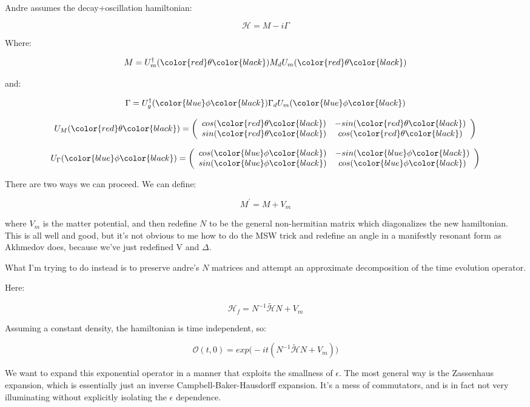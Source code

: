 \documentclass[10pt,letterpaper]{article}
\newcommand{\red}{\color{red}}
\newcommand{\blue}{\color{blue}}
\newcommand{\black}{\color{black}}
\begin{document}
Andre assumes the decay+oscillation hamiltonian:

$$\mathcal{H} = M -i\Gamma$$

Where: 



$$M = U_m^{\dagger}(\red\theta\black)M_d U_m(\red\theta\black)$$

and:

$$\Gamma = U_g^{\dagger}(\blue\phi\black)\Gamma_d U_m(\blue\phi\black)$$




\[U_{M}(\red\theta\black) = \left( \begin{array}{ccc}
cos(\red\theta\black) & -sin(\red\theta\black) \\
sin(\red\theta\black) & cos(\red\theta\black) \\
\end{array} \right)\] 

\[U_{\Gamma}(\blue\phi\black) = \left( \begin{array}{ccc}
cos(\blue\phi\black) & -sin(\blue\phi\black) \\
sin(\blue\phi\black) & cos(\blue\phi\black) \\
\end{array} \right)\]


There are two ways we can proceed. We can define:

$$M^{\prime} = M+V_m$$

where $V_m$ is the matter potential, and then redefine $N$ to be the general non-hermitian matrix which diagonalizes the new hamiltonian. This is all well and good, but it's not obvious to me how to do the MSW trick and redefine an angle in a manifestly resonant form as Akhmedov does, because we've just redefined V and $\Delta$.

What I'm trying to do instead is to preserve andre's $N$ matrices and attempt an approximate decomposition of the time evolution operator.

Here:

$$\mathcal{H}_f = N^{-1}\tilde{\mathcal{H}}N + V_m$$


Assuming a constant density, the hamiltonian is time independent, so:

$$\mathcal{O}(t,0) = exp\big(-it(N^{-1}\tilde{\mathcal{H}}N + V_m)\big)$$

We want to expand this exponential operator in a manner that exploits the smallness of $\epsilon$. The most general way is the Zassenhaus expansion, which is essentially just an inverse Campbell-Baker-Hausdorff expansion. It's a mess of commutators, and is in fact not very illuminating without explicitly isolating the $\epsilon$ dependence.
\end{document}
